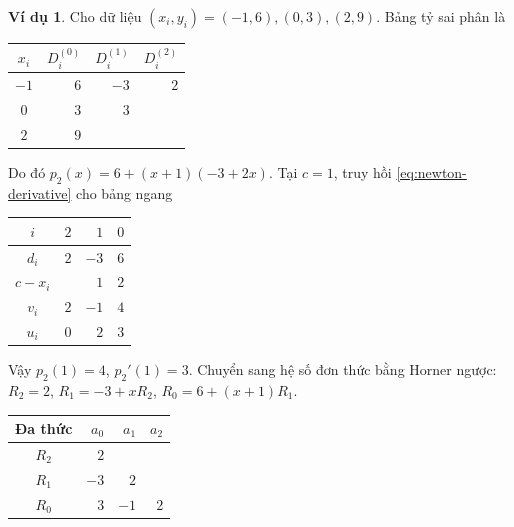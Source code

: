 \documentclass[12pt,a4paper,oneside]{book}
\numberwithin{algorithm}{chapter}
\theoremstyle{definition}
\newtheorem{vidu}{Ví dụ}[chapter]
\begin{document}
\begin{vidu}
Cho dữ liệu $(x_i,y_i)=(-1,6),(0,3),(2,9)$. Bảng tỷ sai phân là
\begin{center}
\begin{tabular}{c|rrr}\toprule
$x_i$&$D_i^{(0)}$&$D_i^{(1)}$&$D_i^{(2)}$\\\midrule
$-1$&$6$&$-3$&$2$\\
$0$&$3$&$3$&\\
$2$&$9$&&\\\bottomrule
\end{tabular}
\end{center}
Do đó $p_2(x)=6+(x+1)(-3+2x)$. Tại $c=1$, truy hồi \eqref{eq:newton-derivative} cho bảng ngang
\begin{center}
\begin{tabular}{c|rrr}\toprule
$i$&$2$&$1$&$0$\\\midrule
$d_i$&$2$&$-3$&$6$\\
$c-x_i$& & $1$&$2$\\
$v_i$&$2$&$-1$&$4$\\
$u_i$&$0$&$2$&$3$\\\bottomrule
\end{tabular}
\end{center}
Vậy $p_2(1)=4$, $p_2'(1)=3$. Chuyển sang hệ số đơn thức bằng Horner ngược: $R_2=2$, $R_1=-3+xR_2$, $R_0=6+(x+1)R_1$.
\begin{center}
\begin{tabular}{c|rrr}\toprule
Đa thức&$a_0$&$a_1$&$a_2$\\\midrule
$R_2$&$2$&&\\
$R_1$&$-3$&$2$&\\
$R_0$&$3$&$-1$&$2$\\\bottomrule
\end{tabular}
\end{center}
\end{vidu}
\end{document}
